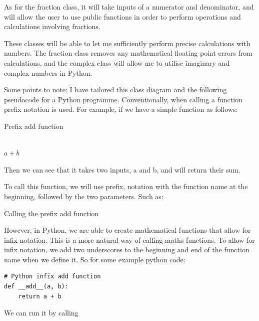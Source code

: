 \documentclass{article}
\begin{document}
As for the fraction class, it will take inputs of a numerator and denominator, and will allow the user to use public functions in order to perform operations and calculations involving fractions.

These classes will be able to let me sufficiently perform precise calculations with numbers. The fraction class removes any mathematical floating point errors from calculations, and the complex class will allow me to utilise imaginary and complex numbers in Python.

Some points to note; I have tailored this class diagram and the following pseudocode for a Python programme. Conventionally, when calling a function prefix notation is used. For example, if we have a simple function as follows:

\begin{algorithm}
    \caption{Prefix add function}
    \begin{algorithmic}
        \\
             \hspace{\algorithmicindent}\Return $a + b$
        \EndFunction
    \end{algorithmic}
\end{algorithm}

Then we can see that it takes two inputs, a and b, and will return their sum.

To call this function, we will use prefix, notation with the function name at the beginning, followed by the two parameters.
Such as:

\begin{algorithm}
    \caption{Calling the prefix add function}
    \begin{algorithmic}
       \State {}
    \end{algorithmic}
\end{algorithm}

However, in Python, we are able to create mathematical functions that allow for infix notation. This is a more natural way of calling maths functions. To allow for infix notation, we add two underscores to the beginning and end of the function name when we define it. So for some example python code:


\begin{lstlisting}
# Python infix add function
def __add__(a, b):
    return a + b
\end{lstlisting}

We can run it by calling
\end{document}
